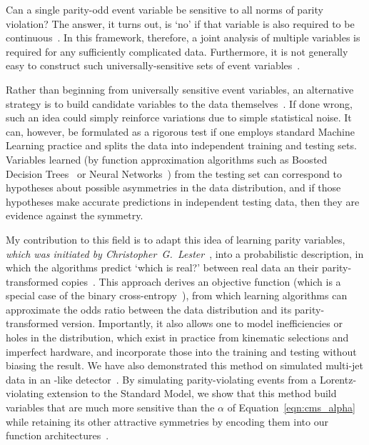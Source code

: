 Can a single parity-odd event variable be sensitive to all norms of parity
violation?
The answer, it turns out, is `no' if that variable is also required to be
continuous~\cite{lesterChiralMeasurements2021}.
In this framework, therefore, a joint analysis of multiple variables is
required for any sufficiently complicated data.
Furthermore, it is not generally easy to construct such universally-sensitive
sets of event variables~\cite{
Gripaios:2020hya,
lester2021lorentz
}.

Rather than beginning from universally sensitive event variables, an
alternative strategy is to build candidate variables to the data
themselves~\cite{lester2021stressed}.
If done wrong, such an idea could simply reinforce variations due to simple
statistical noise.
It can, however, be formulated as a rigorous test if one employs standard
Machine Learning practice and splits the data into independent training and
testing sets.
Variables learned (by function approximation algorithms such as
Boosted Decision Trees~\cite{xgboost} or
Neural Networks~\cite{MurphyKevinP.2012Mlap})
from the testing set can correspond to hypotheses about possible asymmetries
in the data distribution, and if those hypotheses make accurate predictions in
independent testing data, then they are evidence against the symmetry.

My contribution to this field is to adapt this idea of learning parity
variables,
\emph{which was initiated by Christopher~G.~Lester}~\cite{lester2021stressed},
into a probabilistic description, in which the algorithms predict
`which is real?' between real data an their parity-transformed
copies~\cite{tombs2021which}.
This approach derives an objective function
(which is a special case of the binary
cross-entropy~\cite{MurphyKevinP.2012Mlap}),
from which learning algorithms
can approximate the odds ratio between the data distribution and its
parity-transformed version.
Importantly, it also allows one to model inefficiencies or holes in the
distribution, which exist in practice from kinematic selections and imperfect
hardware, and incorporate those into the training and testing without biasing
the result.
We have also demonstrated this method on simulated multi-jet data in an
\atlas-like detector~\cite{lester2022hunting}.
By simulating parity-violating events from a Lorentz-violating extension
to the Standard Model, we show that this method build variables that are much
more sensitive than the $\alpha$ of Equation~\ref{eqn:cms_alpha} while
retaining its other attractive symmetries by encoding them into our function
architectures~\cite{lester2021stressed, tombs2021which}.

